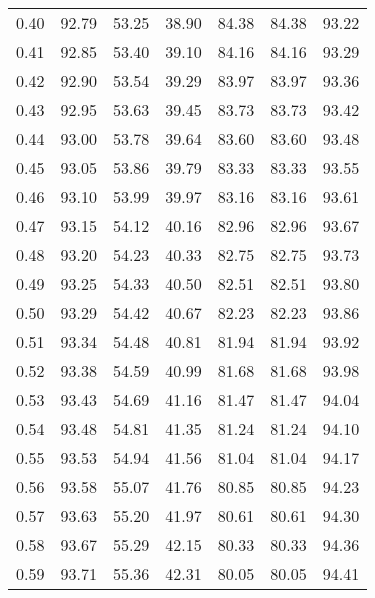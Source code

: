 \begin{tabular}{|c|c|c|c|c|c|c|}
      0.40 &     92.79 &     53.25 &      38.90 &   84.38 &      84.38 &         93.22 \\
      0.41 &     92.85 &     53.40 &      39.10 &   84.16 &      84.16 &         93.29 \\
      0.42 &     92.90 &     53.54 &      39.29 &   83.97 &      83.97 &         93.36 \\
      0.43 &     92.95 &     53.63 &      39.45 &   83.73 &      83.73 &         93.42 \\
      0.44 &     93.00 &     53.78 &      39.64 &   83.60 &      83.60 &         93.48 \\
      0.45 &     93.05 &     53.86 &      39.79 &   83.33 &      83.33 &         93.55 \\
      0.46 &     93.10 &     53.99 &      39.97 &   83.16 &      83.16 &         93.61 \\
      0.47 &     93.15 &     54.12 &      40.16 &   82.96 &      82.96 &         93.67 \\
      0.48 &     93.20 &     54.23 &      40.33 &   82.75 &      82.75 &         93.73 \\
      0.49 &     93.25 &     54.33 &      40.50 &   82.51 &      82.51 &         93.80 \\
      0.50 &     93.29 &     54.42 &      40.67 &   82.23 &      82.23 &         93.86 \\
      0.51 &     93.34 &     54.48 &      40.81 &   81.94 &      81.94 &         93.92 \\
      0.52 &     93.38 &     54.59 &      40.99 &   81.68 &      81.68 &         93.98 \\
      0.53 &     93.43 &     54.69 &      41.16 &   81.47 &      81.47 &         94.04 \\
      0.54 &     93.48 &     54.81 &      41.35 &   81.24 &      81.24 &         94.10 \\
      0.55 &     93.53 &     54.94 &      41.56 &   81.04 &      81.04 &         94.17 \\
      0.56 &     93.58 &     55.07 &      41.76 &   80.85 &      80.85 &         94.23 \\
      0.57 &     93.63 &     55.20 &      41.97 &   80.61 &      80.61 &         94.30 \\
      0.58 &     93.67 &     55.29 &      42.15 &   80.33 &      80.33 &         94.36 \\
      0.59 &     93.71 &     55.36 &      42.31 &   80.05 &      80.05 &         94.41 \\

\end{tabular}
